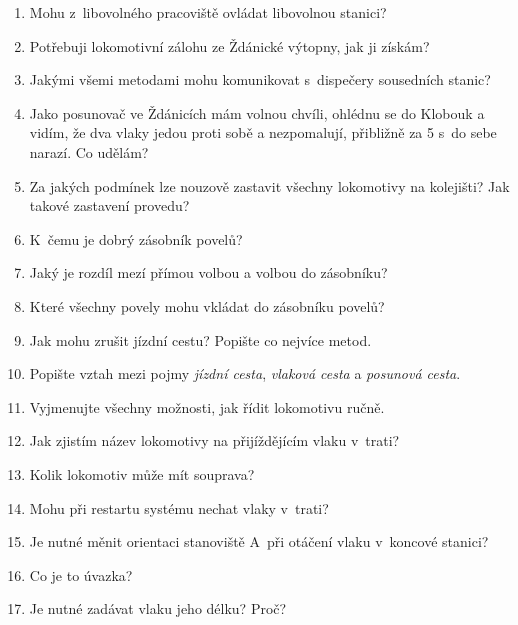 \documentclass[12pt,a4paper]{article}
\begin{document}
\begin{enumerate}[leftmargin=*]
	\item Mohu z~libovolného pracoviště ovládat libovolnou stanici?
	
	\item Potřebuji lokomotivní zálohu ze Ždánické výtopny, jak ji získám?
	
	\item Jakými všemi metodami mohu komunikovat s~dispečery sousedních stanic?
	
	\item Jako posunovač ve Ždánicích mám volnou chvíli, ohlédnu se do Klobouk a vidím, že dva vlaky jedou proti sobě a nezpomalují, přibližně za 5 s~do sebe narazí. Co udělám?
	
	\item Za jakých podmínek lze nouzově zastavit všechny lokomotivy na kolejišti? Jak takové zastavení provedu?
	
	\item K~čemu je dobrý zásobník povelů?
	
	\item Jaký je rozdíl mezí přímou volbou a volbou do zásobníku?
	
	\item Které všechny povely mohu vkládat do zásobníku povelů?
	
	\item Jak mohu zrušit jízdní cestu? Popište co nejvíce metod.
	
	\item Popište vztah mezi pojmy \textit{jízdní cesta}, \textit{vlaková cesta} a \textit{posunová cesta}.
	
	\item Vyjmenujte všechny možnosti, jak řídit lokomotivu ručně.
	
	\item Jak zjistím název lokomotivy na přijíždějícím vlaku v~trati?
	
	\item Kolik lokomotiv může mít souprava?
	
	\item Mohu při restartu systému nechat vlaky v~trati?
	
	\item Je nutné měnit orientaci stanoviště A~při otáčení vlaku v~koncové stanici?
	
	\item Co je to úvazka?
	
	\item Je nutné zadávat vlaku jeho délku? Proč?
	

\end{enumerate}
\end{document}
